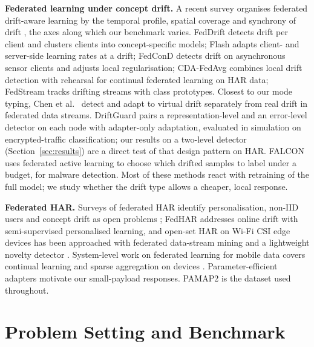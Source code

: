 \documentclass[journal]{IEEEtran}
\begin{document}
\textbf{Federated learning under concept drift.} A recent survey organises federated drift-aware learning by the temporal profile, spatial coverage and synchrony of drift \cite{mahdi2025fdal}, the axes along which our benchmark varies. FedDrift \cite{jothimurugesan2023feddrift} detects drift per client and clusters clients into concept-specific models; Flash \cite{panchal2023flash} adapts client- and server-side learning rates at a drift; FedConD \cite{chen2021fedcond} detects drift on asynchronous sensor clients and adjusts local regularisation; CDA-FedAvg \cite{casado2022cdafedavg} combines local drift detection with rehearsal for continual federated learning on HAR data; FedStream \cite{mawuli2023fedstream} tracks drifting streams with class prototypes. Closest to our mode typing, Chen et al.\ \cite{chen2025virtual} detect and adapt to virtual drift separately from real drift in federated data streams. DriftGuard \cite{driftguard2026} pairs a representation-level and an error-level detector on each node with adapter-only adaptation, evaluated in simulation on encrypted-traffic classification; our results on a two-level detector (Section~\ref{sec:results}) are a direct test of that design pattern on HAR. FALCON \cite{wang2026falcon} uses federated active learning to choose which drifted samples to label under a budget, for malware detection. Most of these methods react with retraining of the full model; we study whether the drift type allows a cheaper, local response.

\textbf{Federated HAR.} Surveys of federated HAR identify personalisation, non-IID users and concept drift as open problems \cite{aouedi2024fedhar}; FedHAR \cite{yu2023fedhar} addresses online drift with semi-supervised personalised learning, and open-set HAR on Wi-Fi CSI edge devices has been approached with federated data-stream mining and a lightweight novelty detector \cite{land2026}. System-level work on federated learning for mobile data covers continual learning and sparse aggregation on devices \cite{jiang2026cm}. Parameter-efficient adapters \cite{houlsby2019adapter} motivate our small-payload responses. PAMAP2 \cite{reiss2012pamap2} is the dataset used throughout.

\section{Problem Setting and Benchmark}
\end{document}
